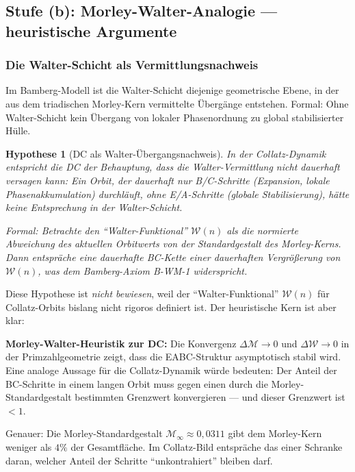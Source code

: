 \documentclass[12pt,a4paper]{article}
\newtheorem{hypothese}[definition]{Hypothese}
\newcommand{\Mcal}{\mathcal{M}}      %
\newcommand{\Wcal}{\mathcal{W}}      %
\begin{document}
\subsection{Stufe (b): Morley-Walter-Analogie --- heuristische Argumente}

\subsubsection{Die Walter-Schicht als Vermittlungsnachweis}

Im Bamberg-Modell ist die Walter-Schicht diejenige geometrische Ebene,
in der aus dem triadischen Morley-Kern vermittelte Übergänge entstehen.
Formal: Ohne Walter-Schicht kein Übergang von lokaler Phasenordnung
zu global stabilisierter Hülle.

\begin{hypothese}[DC als Walter-Übergangsnachweis]
\label{hyp:walter-dc}
In der Collatz-Dynamik entspricht die DC der Behauptung,
dass die \emph{Walter-Vermittlung} nicht dauerhaft versagen kann:
Ein Orbit, der dauerhaft nur B/C-Schritte (Expansion, lokale Phasenakkumulation)
durchläuft, ohne E/A-Schritte (globale Stabilisierung), hätte keine
Entsprechung in der Walter-Schicht.

Formal: Betrachte den ``Walter-Funktional'' $\Wcal(n)$ als die
normierte Abweichung des aktuellen Orbitwerts von der
Standardgestalt des Morley-Kerns. Dann entspräche eine dauerhafte
BC-Kette einer dauerhaften Vergrößerung von $\Wcal(n)$,
was dem Bamberg-Axiom \textup{B-WM-1} widerspricht.
\end{hypothese}

Diese Hypothese ist \emph{nicht bewiesen}, weil der ``Walter-Funktional''
$\Wcal(n)$ für Collatz-Orbits bislang nicht rigoros definiert ist.
Der heuristische Kern ist aber klar:

\begin{tcolorbox}[morley]
\textbf{Morley-Walter-Heuristik zur DC:}
Die Konvergenz $\Delta\Mcal \to 0$ und $\Delta\Wcal \to 0$
in der Primzahlgeometrie zeigt, dass die EABC-Struktur
asymptotisch stabil wird. Eine analoge Aussage für die Collatz-Dynamik
würde bedeuten: Der Anteil der BC-Schritte in einem langen Orbit
muss gegen einen durch die Morley-Standardgestalt bestimmten
Grenzwert konvergieren --- und dieser Grenzwert ist $< 1$.

Genauer: Die Morley-Standardgestalt $\Mcal_\infty \approx 0{,}0311$ gibt
dem Morley-Kern weniger als $4\%$ der Gesamtfläche.
Im Collatz-Bild entspräche das einer Schranke daran,
welcher Anteil der Schritte ``unkontrahiert'' bleiben darf.
\end{tcolorbox}
\end{document}
